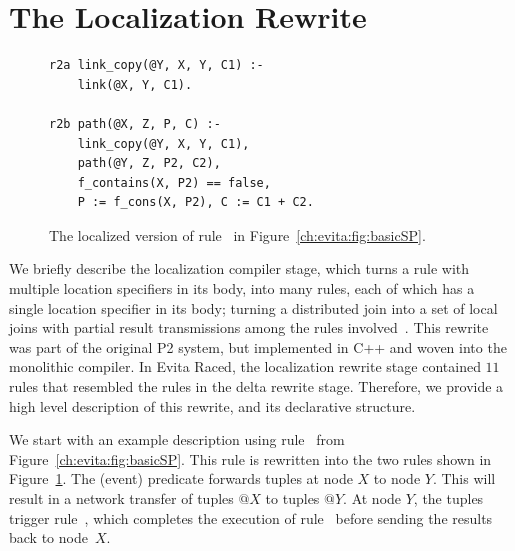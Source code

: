 \section{The Localization Rewrite}
\label{ch:evita:sec:local}

\begin{figure}
\ssp
\centering
\begin{lstlisting}
r2a link_copy(@Y, X, Y, C1) :-
    link(@X, Y, C1).

r2b path(@X, Z, P, C) :-
    link_copy(@Y, X, Y, C1), 
    path(@Y, Z, P2, C2),
    f_contains(X, P2) == false,
    P := f_cons(X, P2), C := C1 + C2.
\end{lstlisting}
\caption{\label{ch:evita:fig:basicSPLocal}The localized version of rule~ in
Figure~\ref{ch:evita:fig:basicSP}.}
\end{figure}

We briefly describe the localization compiler stage, which turns a rule with
multiple location specifiers in its body, into many rules, each of which has a
single location specifier in its body; turning a distributed join into a set of
local joins with partial result transmissions among the rules
involved~\cite{loo-sigmod06}.  This rewrite was part of the original P2 system,
but implemented in C++ and woven into the monolithic compiler.  In Evita Raced,
the localization rewrite stage contained $11$ rules that resembled the rules in
the delta rewrite stage.  Therefore, we provide a high level description of
this rewrite, and its declarative structure.

We start with an example description using rule~ from
Figure~\ref{ch:evita:fig:basicSP}.  This rule is rewritten into the two rules
shown in Figure~\ref{ch:evita:fig:basicSPLocal}.  The  (event)
predicate forwards  tuples at node $X$ to node $Y$.  This will result
in a network transfer of  tuples $@X$ to  tuples $@Y$.
At node $Y$, the  tuples trigger rule~, which completes
the execution of rule~ before sending the  results back to
node~$X$.

